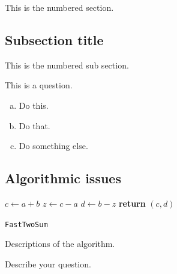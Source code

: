 \documentclass{article}
\begin{document}
This is the numbered section.

\subsection{Subsection title}

This is the numbered sub section.

\begin{question}
    This is a question.

  \begin{enumerate}[(a)]
    \item Do this.
    \item Do that.
    \item Do something else.
  \end{enumerate}
\end{question}

\subsection{Algorithmic issues}


\begin{center}
  \begin{minipage}{0.5\linewidth} %
    \begin{algorithm}[H]
      \medskip
      $c \leftarrow a + b$ \;
      $z \leftarrow c - a$ \;
      $d \leftarrow b - z$ \;
      {\bf return} $(c,d)$ \;
      \caption{\texttt{FastTwoSum}} %
      \label{alg:fastTwoSum}   %
    \end{algorithm}
  \end{minipage}
\end{center}

Descriptions of the algorithm.

\begin{question}
    Describe your question.
\end{question}
\end{document}
